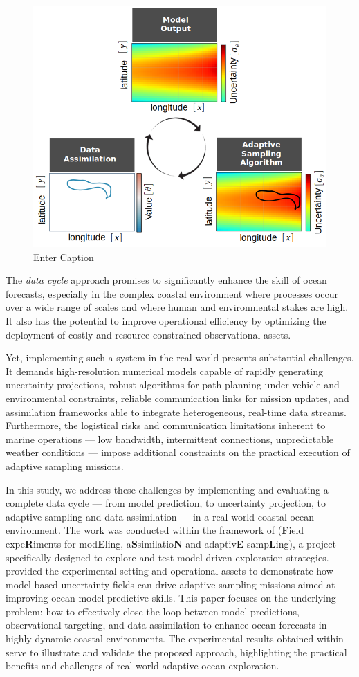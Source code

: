 \begin{figure}
    \centering
    \includegraphics[width=.7\linewidth]{fig/data_cycle.png}
    \caption{Enter Caption}
    \label{fig:enter-label}
\end{figure}

The \textit{data cycle} approach promises to significantly enhance the skill of ocean forecasts, especially in the complex coastal environment where processes occur over a wide range of scales and where human and environmental stakes are high. It also has the potential to improve operational efficiency by optimizing the deployment of costly and resource-constrained observational assets.

Yet, implementing such a system in the real world presents substantial challenges. It demands high-resolution numerical models capable of rapidly generating uncertainty projections, robust algorithms for path planning under vehicle and environmental constraints, reliable communication links for mission updates, and assimilation frameworks able to integrate heterogeneous, real-time data streams. Furthermore, the logistical risks and communication limitations inherent to marine operations — low bandwidth, intermittent connections, unpredictable weather conditions — impose additional constraints on the practical execution of adaptive sampling missions.

In this study, we address these challenges by implementing and evaluating a complete data cycle — from model prediction, to uncertainty projection, to adaptive sampling and data assimilation — in a real-world coastal ocean environment. The work was conducted within the framework of  \proj (\textbf{F}ield expe\textbf{R}iments for mod\textbf{E}ling,
a\textbf{S}similatio\textbf{N} and adaptiv\textbf{E}
samp\textbf{L}ing), a project specifically designed to explore and test model-driven exploration strategies. \proj provided the experimental setting and operational assets to demonstrate how model-based uncertainty fields can drive adaptive sampling missions aimed at improving ocean model predictive skills. This paper focuses on the underlying problem: how to effectively close the loop between model predictions, observational targeting, and data assimilation to enhance ocean forecasts in highly dynamic coastal environments. The experimental results obtained within \proj serve to illustrate and validate the proposed approach, highlighting the practical benefits and challenges of real-world adaptive ocean exploration.


